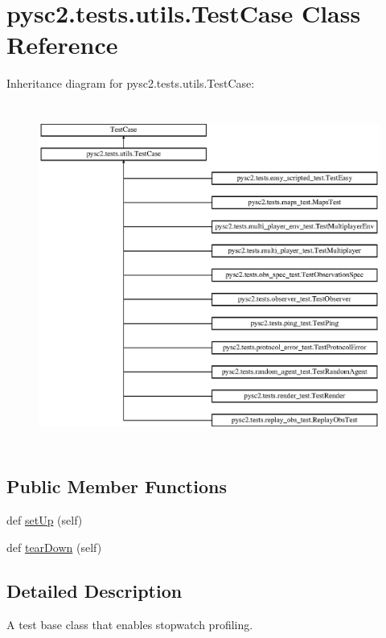 \hypertarget{classpysc2_1_1tests_1_1utils_1_1_test_case}{}\section{pysc2.\+tests.\+utils.\+Test\+Case Class Reference}
\label{classpysc2_1_1tests_1_1utils_1_1_test_case}
Inheritance diagram for pysc2.\+tests.\+utils.\+Test\+Case\+:\begin{figure}[H]
\begin{center}
\leavevmode
\includegraphics[height=11.339563cm]{classpysc2_1_1tests_1_1utils_1_1_test_case}
\end{center}
\end{figure}
\subsection*{Public Member Functions}
\begin{DoxyCompactItemize}
\item 
def \mbox{\hyperlink{classpysc2_1_1tests_1_1utils_1_1_test_case_a2b119fadd4e4bc8426e9d8649bc8026b}{set\+Up}} (self)
\item 
def \mbox{\hyperlink{classpysc2_1_1tests_1_1utils_1_1_test_case_acc0033ea0db648be45dc53eaf0dc72b7}{tear\+Down}} (self)
\end{DoxyCompactItemize}


\subsection{Detailed Description}
\begin{DoxyVerb}A test base class that enables stopwatch profiling.\end{DoxyVerb}
 

